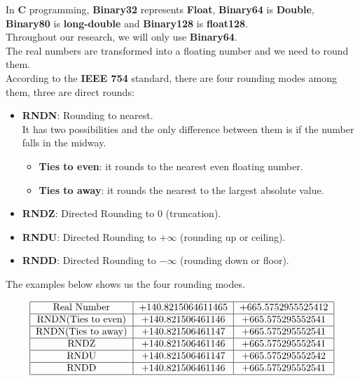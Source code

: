 In \textbf{C} programming, \textbf{Binary32} represents \textbf{Float}, \textbf{Binary64} is \textbf{Double}, \textbf{Binary80} is \textbf{long-double} and \textbf{Binary128} is \textbf{float128}.\\
Throughout our research, we will only use \textbf{Binary64}.\\
The real numbers are transformed into a floating number and we need to round them.\\
According to the \textbf{IEEE 754} standard, there are four rounding modes among them, three are direct rounds:
\begin{itemize}
    \item \textbf{RNDN}: Rounding to nearest.\\
    It has two possibilities and the only difference between them is if the number falls in the midway.
    \begin{itemize}
        \item \textbf{Ties to even}:
         it rounds to the nearest even floating number.
        \item \textbf{Ties to away}:
        it rounds the nearest to the largest absolute value.  
    \end{itemize}
    \item \textbf{RNDZ}: Directed Rounding to $0$ (truncation).
    \item \textbf{RNDU}: Directed Rounding to $+\infty$ (rounding up or ceiling).
    \item \textbf{RNDD}: Directed Rounding to $-\infty$ (rounding down or floor).
\end{itemize}

The examples below shows us the four rounding modes.\\
\begin{table}[hbtp]
        \centering
    $$\begin{tabular}{|c|c|c|}
    \hline
    Real Number & +140.8215064611465 & +665.5752955525412\\
    \hline
    RNDN(Ties to even) & +140.821506461146 & +665.575295552541\\
    \hline
    RNDN(Ties to away) & +140.821506461147 & +665.575295552541\\
    \hline
    RNDZ & +140.821506461146 & +665.575295552541\\
    \hline
    RNDU & +140.821506461147 & +665.575295552542\\ 
    \hline
    RNDD & +140.821506461146 & +665.575295552541\\
    \hline
    \end{tabular}$$
        \caption{roundings with positive reals}
        \label{tab:positive reals}
    \end{table}
    
